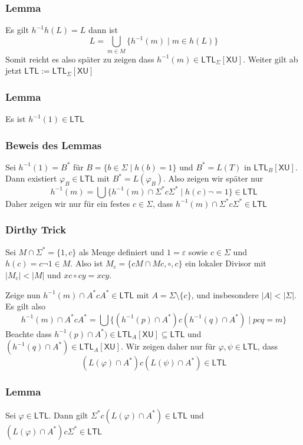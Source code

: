 \documentclass[12pt, german]{article}
\newcommand{\sigstern}{\Sigma^\ast}
\newcommand{\inv}{^{-1}}
\newcommand{\aast}{A^{\ast}}
\newcommand{\bast}{B^{\ast}}
\newcommand{\ltl}{\mathsf{LTL}}
\newcommand{\sX}{\mathsf{X}}
\newcommand{\sU}{\mathsf{U}}
\begin{document}
\subsubsection{Lemma}
	Es gilt $h\inv h(L) = L$ dann ist $$L = \bigcup_{m \in M}\{h\inv(m) \mid m \in h(L) \}$$
	Somit reicht es also später zu zeigen dass $h^{-1} (m) \in  \ltl_\Sigma[\sX\sU]$. 
	Weiter gilt ab jetzt $\ltl :=  \ltl_\Sigma[\sX\sU]$

\subsubsection{Lemma}
	Es ist $h\inv(1) \in \ltl$
\subsubsection{Beweis des Lemmas}
	Sei $h\inv(1) = \bast$ für $B = \{b \in \Sigma \mid h(b) = 1\}$ und $\bast = L(T)$ in $ \ltl_B[\sX\sU]$. Dann existiert $\varphi_B \in \ltl$ mit $\bast = L(\varphi_B)$.
	Also zeigen wir später nur $$h\inv(m) = \bigcup\{h\inv(m) \cap \sigstern c \sigstern \mid h(c) \neg = 1\} \in \ltl$$ Daher zeigen wir nur für ein festes $c \in \Sigma$, dass $h\inv(m) \cap \sigstern c \sigstern \in \ltl$

\subsubsection{Dirthy Trick}
	Sei $M \cap \sigstern = \{1, c\}$ als Menge definiert und $1 = \varepsilon$ sowie $c \in \Sigma$ und $h(c) = c \neg 1 \in M$. Also ist $M_c = \{cM\cap Mc, \circ, c\}$ ein lokaler Divisor mit $|M_c| < |M|$ und $xc \circ cy = xcy$. 
	\newline
	
	Zeige nun $h\inv(m) \cap \aast c \aast \in \ltl$ mit $A = \Sigma \setminus \{c\}$, und insbesondere $|A| <| \Sigma|$. 
	Es gilt also $$h\inv(m) \cap \aast c \aast  = \bigcup\{(h\inv(p) \cap \aast)c(h\inv(q)\cap \aast) \mid pcq = m\}$$
	Beachte dass $h\inv(p) \cap \aast) \in \ltl_A[\sX\sU] \subseteq \ltl$ und $(h\inv(q)\cap \aast) \in  \ltl_A[\sX\sU]$. Wir zeigen daher nur für $\varphi, \psi \in \ltl$, dass 
	$$(L(\varphi) \cap \aast) c (L(\psi) \cap \aast) \in \ltl$$
	
\subsubsection{Lemma}
	Sei $\varphi \in \ltl$. Dann gilt $\sigstern c (L(\varphi) \cap \aast) \in \ltl$ und $(L(\varphi) \cap \aast)c \sigstern \in \ltl$
	
\end{document}
